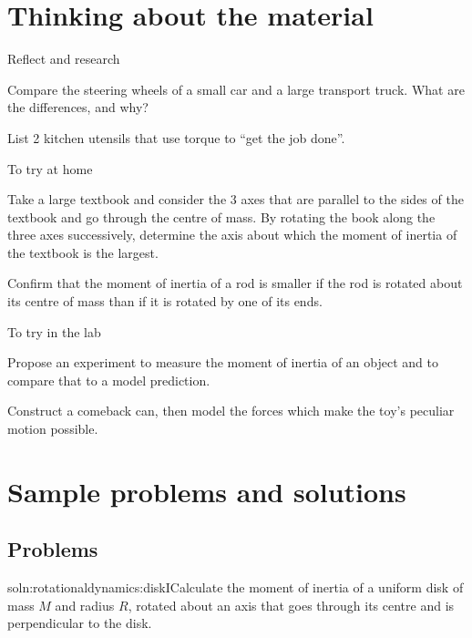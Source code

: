 \newpage
\section{Thinking about the material}
\begin{chapteractivity}{Reflect and research}
{
\item Compare the steering wheels of a small car and a large transport truck. What are the differences, and why?
\item List 2 kitchen utensils that use torque to ``get the job done''.
}
\end{chapteractivity}

\begin{chapteractivity}{To try at home}
{
\item Take a large textbook and consider the 3 axes that are parallel to the sides of the textbook and go through the centre of mass. By rotating the book along the three axes successively, determine the axis about which the moment of inertia of the textbook is the largest.
\item Confirm that the moment of inertia of a rod is smaller if the rod is rotated about its centre of mass than if it is rotated by one of its ends.
}
\end{chapteractivity}


\begin{chapteractivity}{To try in the lab}
{
\item Propose an experiment to measure the moment of inertia of an object and to compare that to a model prediction.
\item Construct a comeback can, then model the forces which make the toy's peculiar motion possible.
}
\end{chapteractivity}

\newpage
\section{Sample problems and solutions}
\subsection{Problems}

\begin{problem}{soln:rotationaldynamics:diskI}{\label{prob:rotationaldynamics:diskI}Calculate the moment of inertia of a uniform disk of mass $M$ and radius $R$, rotated about an axis that goes through its centre and is perpendicular to the disk.}
\end{problem}


